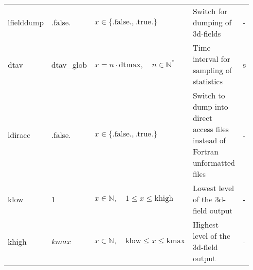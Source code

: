 \documentclass[twoside,11pt,fleqn,a4paper,english,openright]{report}
\begin{document}
\begin{center}
  \tablelasttail{
        &&&&\\\hline
  }
\begin{supertabular}{|l|p{1.6cm}|p{4.8cm}|p{6cm}|l|}
  lfielddump	& .false.	& $x\in\{\text{.false.},\text{.true.}\}$	& Switch for dumping of 3d-fields		& -\\
  dtav		& dtav\_glob	& $x = n \cdot \text{dtmax}, \quad n \in \mathbb{N}^*$	& Time interval for sampling of statistics	& s\\
  ldiracc	& .false.	& $x\in\{\text{.false.},\text{.true.}\}$	& Switch to dump into direct access files instead of Fortran unformatted files		& -\\
  klow		& 1		& $x \in \mathbb{N}, \quad 1 \le x \le \text{khigh}$	& Lowest level of the 3d-field output		& -\\
  khigh		& $kmax$	& $x \in \mathbb{N}, \quad \text{klow} \le x \le \text{kmax}$	& Highest level of the 3d-field output		& -\\
\end{supertabular}
\end{center}
\end{document}

